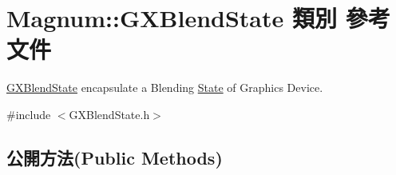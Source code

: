 \hypertarget{class_magnum_1_1_g_x_blend_state}{}\section{Magnum\+:\+:G\+X\+Blend\+State 類別 參考文件}
\label{class_magnum_1_1_g_x_blend_state}


\hyperlink{class_magnum_1_1_g_x_blend_state}{G\+X\+Blend\+State} encapsulate a Blending \hyperlink{class_magnum_1_1_state}{State} of Graphics Device.  




{\ttfamily \#include $<$G\+X\+Blend\+State.\+h$>$}

\subsection*{公開方法(Public Methods)}
